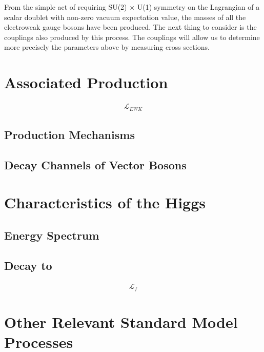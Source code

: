 From the simple act of requiring SU(2) $\times$ U(1) symmetry on the Lagrangian of a scalar
doublet with non-zero vacuum expectation value,
the masses of all the electroweak gauge bosons have been produced.
The next thing to consider is the couplings also produced by this process.
The couplings will allow us to determine more precisely the parameters above
by measuring cross sections.

\section{Associated Production}

\begin{gather}
  \mathcal{L}_{EWK}
\end{gather}

\subsection{Production Mechanisms}

\subsection{Decay Channels of Vector Bosons}

\section{Characteristics of the Higgs}

\subsection{Energy Spectrum}

\subsection{Decay to \bb}

\begin{gather}
  \mathcal{L}_{f}
\end{gather}

\section{Other Relevant Standard Model Processes}
